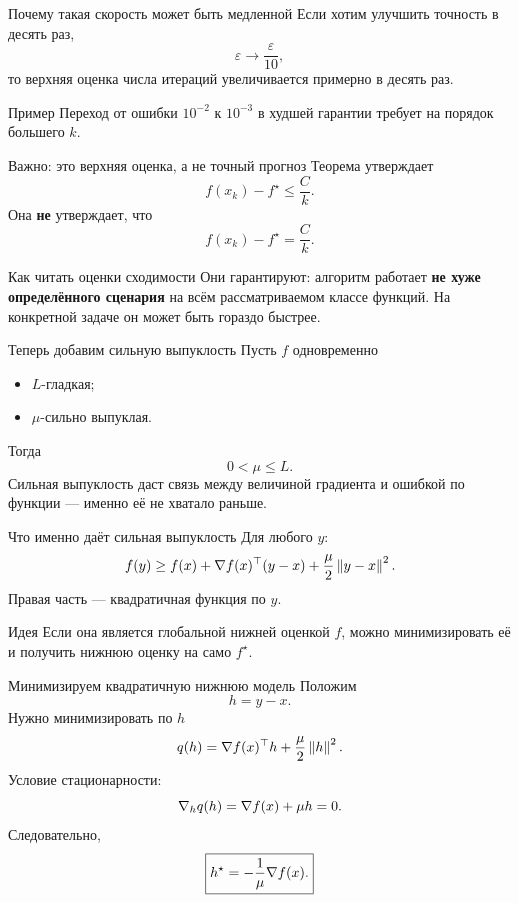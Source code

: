 \begin{frame}{Почему такая скорость может быть медленной}
\small
Если хотим улучшить точность в десять раз,
\[
\varepsilon
\longrightarrow
\frac{\varepsilon}{10},
\]
то верхняя оценка числа итераций увеличивается примерно в десять раз.

\begin{exampleblock}{Пример}
Переход от ошибки $10^{-2}$ к $10^{-3}$ в худшей гарантии требует на порядок большего $k$.
\end{exampleblock}
\end{frame}

\begin{frame}{Важно: это верхняя оценка, а не точный прогноз}
\small
Теорема утверждает
\[
f(x_k)-f^\star
\le
\frac{C}{k}.
\]
Она \textbf{не} утверждает, что
\[
f(x_k)-f^\star=\frac{C}{k}.
\]

\begin{alertblock}{Как читать оценки сходимости}
Они гарантируют: алгоритм работает \textbf{не хуже определённого сценария} на всём рассматриваемом классе функций. На конкретной задаче он может быть гораздо быстрее.
\end{alertblock}
\end{frame}

\begin{frame}{Теперь добавим сильную выпуклость}
\small
Пусть $f$ одновременно
\begin{itemize}
\item $L$-гладкая;
\item $\mu$-сильно выпуклая.
\end{itemize}
Тогда
\[
0<\mu\le L.
\]
Сильная выпуклость даст связь между величиной градиента и ошибкой по функции — именно её не хватало раньше.
\end{frame}

\begin{frame}{Что именно даёт сильная выпуклость}
\small
Для любого $y$:
\[
f(y)
\ge
f(x)+\nabla f(x)^\top(y-x)
+\frac\mu2\left\lVert y-x\right\rVert^2.
\]
Правая часть — квадратичная функция по $y$.

\begin{block}{Идея}
Если она является глобальной нижней оценкой $f$, можно минимизировать её и получить нижнюю оценку на само $f^\star$.
\end{block}
\end{frame}

\begin{frame}{Минимизируем квадратичную нижнюю модель}
\small
Положим
\[
h=y-x.
\]
Нужно минимизировать по $h$
\[
q(h)=\nabla f(x)^\top h+\frac\mu2\left\lVert h\right\rVert^2.
\]
Условие стационарности:
\[
\nabla_h q(h)=\nabla f(x)+\mu h=0.
\]
Следовательно,
\[
\boxed{
h^\star=-\frac1\mu\nabla f(x).
}
\]
\end{frame}

